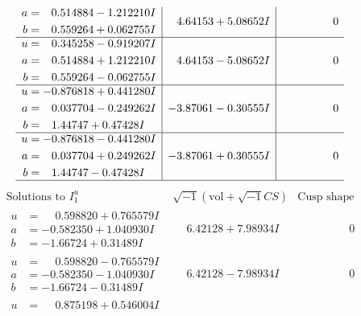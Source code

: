 \documentclass[1p]{elsarticle_modified}
\theoremstyle{definition}
\newcommand{\I}{\sqrt{-1}}
\begin{document}
$$\begin{array}{c|c|c}
\begin{aligned}
a &= \phantom{-}0.514884 - 1.212210 I \\
b &= \phantom{-}0.559264 + 0.062755 I\end{aligned}
 & \phantom{-}4.64153 + 5.08652 I & \phantom{-0.000000 } 0 \\ \hline\begin{aligned}
u &= \phantom{-}0.345258 - 0.919207 I \\
a &= \phantom{-}0.514884 + 1.212210 I \\
b &= \phantom{-}0.559264 - 0.062755 I\end{aligned}
 & \phantom{-}4.64153 - 5.08652 I & \phantom{-0.000000 } 0 \\ \hline\begin{aligned}
u &= -0.876818 + 0.441280 I \\
a &= \phantom{-}0.037704 - 0.249262 I \\
b &= \phantom{-}1.44747 + 0.47428 I\end{aligned}
 & -3.87061 - 0.30555 I & \phantom{-0.000000 } 0 \\ \hline\begin{aligned}
u &= -0.876818 - 0.441280 I \\
a &= \phantom{-}0.037704 + 0.249262 I \\
b &= \phantom{-}1.44747 - 0.47428 I\end{aligned}
 & -3.87061 + 0.30555 I & \phantom{-0.000000 } 0\\
 \hline 
 \end{array}$$\newpage$$\begin{array}{c|c|c}  
\text{Solutions to }I^u_{1}& \I (\text{vol} + \sqrt{-1}CS) & \text{Cusp shape}\\
 \hline 
\begin{aligned}
u &= \phantom{-}0.598820 + 0.765579 I \\
a &= -0.582350 + 1.040930 I \\
b &= -1.66724 + 0.31489 I\end{aligned}
 & \phantom{-}6.42128 + 7.98934 I & \phantom{-0.000000 } 0 \\ \hline\begin{aligned}
u &= \phantom{-}0.598820 - 0.765579 I \\
a &= -0.582350 - 1.040930 I \\
b &= -1.66724 - 0.31489 I\end{aligned}
 & \phantom{-}6.42128 - 7.98934 I & \phantom{-0.000000 } 0 \\ \hline\begin{aligned}
u &= \phantom{-}0.875198 + 0.546004 I \\

\end{aligned}
\end{array}$$
\end{document}
